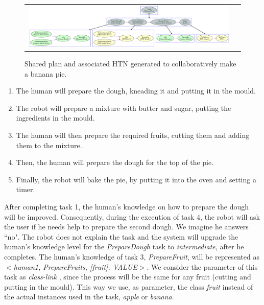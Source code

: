 \begin{figure}[ht!]
 \centering
 \begin{tabular}{cc}
  \includegraphics[width=0.99\textwidth]{img/plan_management/bananaPie.pdf}
 \end{tabular}
   \vspace{-8pt}
 \caption{Shared plan and associated HTN generated to collaboratively make a banana pie.}
 \label{fig:plan_management-bananaPlan}
   \vspace{-22pt}
 \end{figure}
 

\begin{enumerate}
\item The human will prepare the dough, kneading it and putting it in the mould.
\item The robot will prepare a mixture with butter and sugar, putting the ingredients in the mould.
\item The human will then prepare the required fruits, cutting them and adding them to the mixture..
\item Then, the human will prepare the dough for the top of the pie.
\item Finally, the robot will bake the pie, by putting it into the oven and setting a timer.
\end{enumerate} 

After completing task 1, the human's knowledge on how to prepare the dough will be improved. Consequently, during the execution of task 4, the robot will ask the user if he needs help to prepare the second dough. We imagine he answers ``no". The robot does not explain the task  and the system will upgrade the human's knowledge level for the \textit{PrepareDough} task to  \textit{intermediate}, after he completes. The human's knowledge of task 3, \textit{PrepareFruit}, will be represented as \textit{$<$human1, PrepareFruits, [fruit], VALUE$>$}. We consider the parameter of this task as \textit{class-link} , since the process will be the same for any fruit (cutting and putting in the mould). This way we use, as parameter, the class \textit{fruit} instead of the actual instances used in the task, \textit{apple} or \textit{banana}.

